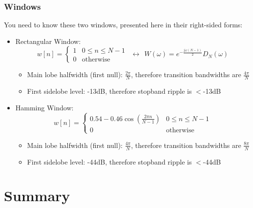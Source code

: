 \documentclass{beamer}
\begin{document}
\begin{frame}
  \frametitle{Windows}

  You need to know these two windows, presented here in
  their right-sided forms:
  \begin{itemize}
  \item Rectangular Window:
    \begin{displaymath}
      w[n]=\begin{cases}1&0\le n\le N-1\\0&\mbox{otherwise}\end{cases}~~\leftrightarrow~~
      W(\omega) = e^{-\frac{j\omega (N-1)}{2}}D_N(\omega)
    \end{displaymath}
    \begin{itemize}
    \item Main lobe halfwidth (first null): $\frac{2\pi}{N}$, therefore transition bandwidths
      are $\frac{4\pi}{N}$
    \item First sidelobe level: -13dB, therefore stopband ripple is $<$-13dB
    \end{itemize}
  \item Hamming Window:
    \begin{displaymath}
      w[n]=\begin{cases}
      0.54-0.46\cos\left(\frac{2\pi n}{N-1}\right)&0\le n\le N-1\\0&\mbox{otherwise}
      \end{cases}
    \end{displaymath}
    \begin{itemize}
    \item Main lobe halfwidth (first null): $\frac{4\pi}{N}$, therefore transition bandwidths
      are $\frac{8\pi}{N}$
    \item First sidelobe level: -44dB, therefore stopband ripple is $<$-44dB
    \end{itemize}
  \end{itemize}
\end{frame}

\section[Summary]{Summary}
\setcounter{subsection}{1}
\end{document}

